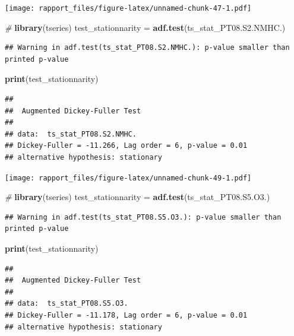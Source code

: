 \documentclass[]{article}
\newenvironment{Shaded}{\begin{snugshade}}{\end{snugshade}}
\newcommand{\KeywordTok}[1]{\textcolor[rgb]{0.13,0.29,0.53}{\textbf{#1}}}
\newcommand{\StringTok}[1]{\textcolor[rgb]{0.31,0.60,0.02}{#1}}
\newcommand{\CommentTok}[1]{\textcolor[rgb]{0.56,0.35,0.01}{\textit{#1}}}
\newcommand{\NormalTok}[1]{#1}
\begin{document}
\texttt{[image: rapport\_files/figure-latex/unnamed-chunk-47-1.pdf]}

\begin{Shaded}
\begin{Highlighting}[]
\CommentTok{#}
\KeywordTok{library}\NormalTok{(tseries)}
\NormalTok{test_stationnarity =}\StringTok{ }\KeywordTok{adf.test}\NormalTok{(ts_stat_PT08.S2.NMHC.)}
\end{Highlighting}
\end{Shaded}

\begin{verbatim}
## Warning in adf.test(ts_stat_PT08.S2.NMHC.): p-value smaller than printed p-value
\end{verbatim}

\begin{Shaded}
\begin{Highlighting}[]
\KeywordTok{print}\NormalTok{(test_stationnarity)}
\end{Highlighting}
\end{Shaded}

\begin{verbatim}
## 
##  Augmented Dickey-Fuller Test
## 
## data:  ts_stat_PT08.S2.NMHC.
## Dickey-Fuller = -11.266, Lag order = 6, p-value = 0.01
## alternative hypothesis: stationary
\end{verbatim}

\texttt{[image: rapport\_files/figure-latex/unnamed-chunk-49-1.pdf]}

\begin{Shaded}
\begin{Highlighting}[]
\CommentTok{#}
\KeywordTok{library}\NormalTok{(tseries)}
\NormalTok{test_stationnarity =}\StringTok{ }\KeywordTok{adf.test}\NormalTok{(ts_stat_PT08.S5.O3.)}
\end{Highlighting}
\end{Shaded}

\begin{verbatim}
## Warning in adf.test(ts_stat_PT08.S5.O3.): p-value smaller than printed p-value
\end{verbatim}

\begin{Shaded}
\begin{Highlighting}[]
\KeywordTok{print}\NormalTok{(test_stationnarity)}
\end{Highlighting}
\end{Shaded}

\begin{verbatim}
## 
##  Augmented Dickey-Fuller Test
## 
## data:  ts_stat_PT08.S5.O3.
## Dickey-Fuller = -11.178, Lag order = 6, p-value = 0.01
## alternative hypothesis: stationary
\end{verbatim}
\end{document}

